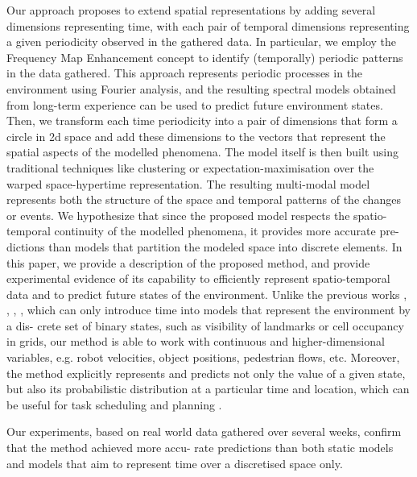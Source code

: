  Our  approach  proposes  to  extend  spatial  representations by  adding  several  dimensions  representing  time,  with  each pair of temporal dimensions representing a given periodicity observed  in  the  gathered  data.
  In  particular,  we  employ the  Frequency  Map  Enhancement  \cite{krajnik2017fremen}  concept  to  identify (temporally)  periodic  patterns  in  the  data  gathered.
  This approach  represents  periodic  processes  in  the  environment using  Fourier  analysis,  and  the  resulting  spectral  models obtained  from  long-term  experience  can  be  used  to  predict future  environment  states.
  Then,  we  transform  each  time periodicity  into  a  pair  of  dimensions  that  form  a  circle in  2d space  and  add  these  dimensions  to  the  vectors  that represent  the  spatial  aspects  of  the  modelled  phenomena.
 The  model  itself  is  then  built  using  traditional  techniques like clustering or expectation-maximisation over the warped space-hypertime  representation.
  The  resulting  multi-modal model represents both the structure of the space and temporal patterns of the changes or events.
 We hypothesize that since the  proposed  model  respects  the  spatio-temporal  continuity of the modelled phenomena, it provides more accurate pre- dictions  than  models  that  partition  the  modeled  space  into discrete  elements.
  In  this  paper,  we  provide  a  description of the proposed method, and provide experimental evidence of its capability to efficiently represent spatio-temporal data and  to  predict  future  states  of  the  environment.
  Unlike  the previous  works  \cite{tipaldi2013lifelong},  \cite{rosen2016towards},  \cite{kucner2013conditional},  \cite{krajnik2017fremen},  which  can  only  introduce time  into  models  that  represent  the  environment  by  a  dis- crete  set  of  binary  states,  such  as  visibility  of  landmarks or  cell  occupancy  in  grids,  our  method  is  able  to  work with continuous and higher-dimensional variables, e.g. robot velocities, object positions, pedestrian flows, etc.
 Moreover, the  method  explicitly  represents  and  predicts  not  only  the value  of  a  given  state,  but  also  its  probabilistic  distribution at  a  particular  time  and  location,  which  can  be  useful  for task scheduling and planning \cite{mudrova2015integrated}.

 Our experiments, based on real world data gathered over several weeks, confirm that the method achieved more accu- rate predictions than both static models and models that aim to represent time over a discretised space only.
 

